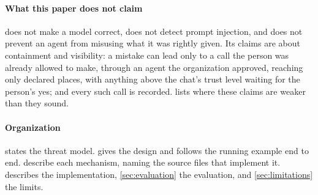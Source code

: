\paragraph{What this paper does not claim}
\sys{} does not make a model correct, does not detect prompt injection,
and does not prevent an agent from misusing what it was rightly given.
Its claims are about containment and visibility: a mistake can lead
only to a call the person was already allowed to make, through an
agent the organization approved, reaching only declared places, with
anything above the chat's trust level waiting for the person's yes;
and every such call is recorded.  lists where
these claims are weaker than they sound.

\paragraph{Organization}
 states the threat model.  gives the
design and follows the running example end to end.
describe each mechanism, naming the source files that implement it.
 describes the implementation,
\cref{sec:evaluation} the evaluation, and \cref{sec:limitations} the
limits.
